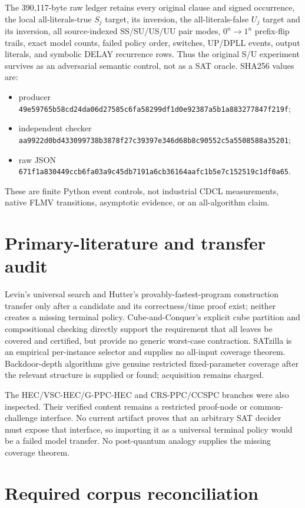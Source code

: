 \documentclass[11pt]{article}
\begin{document}
The 390,117-byte raw ledger retains every original clause and signed occurrence,
the local all-literals-true $S_j$ target, its inversion, the all-literals-false
$U_j$ target and its inversion, all source-indexed SS/SU/US/UU pair modes,
$0^n\to1^n$ prefix-flip trails, exact model counts, failed policy order,
switches, UP/DPLL events, output literals, and symbolic DELAY recurrence rows.
Thus the original S/U experiment survives as an adversarial semantic control,
not as a SAT oracle.  SHA256 values are:
\begin{itemize}
\item producer \texttt{49e59765b58cd24da06d27585c6fa58299df1d0e92387a5b1a883277847f219f};
\item independent checker \texttt{aa9922d0bd433099738b3878f27c39397e346d68b8c90552c5a5508588a35201};
\item raw JSON \texttt{671f1a830449ccb6fa03a9c45db7191a6cb36164aafc1b5e7c152519c1df0a65}.
\end{itemize}
These are finite Python event controls, not industrial CDCL measurements, native
FLMV transitions, asymptotic evidence, or an all-algorithm claim.

\section{Primary-literature and transfer audit}
Levin's universal search and Hutter's provably-fastest-program construction
transfer only after a candidate and its correctness/time proof exist; neither
creates a missing terminal policy.  Cube-and-Conquer's explicit cube partition
and compositional checking directly support the requirement that all leaves be
covered and certified, but provide no generic worst-case contraction.  SATzilla
is an empirical per-instance selector and supplies no all-input coverage theorem.
Backdoor-depth algorithms give genuine restricted fixed-parameter coverage after
the relevant structure is supplied or found; acquisition remains charged.

The HEC/VSC-HEC/G-PPC-HEC and CRS-PPC/CCSPC branches were also inspected.
Their verified content remains a restricted proof-node or common-challenge
interface.  No current artifact proves that an arbitrary SAT decider must expose
that interface, so importing it as a universal terminal policy would be a failed
model transfer.  No post-quantum analogy supplies the missing coverage theorem.

\section{Required corpus reconciliation}
\end{document}
